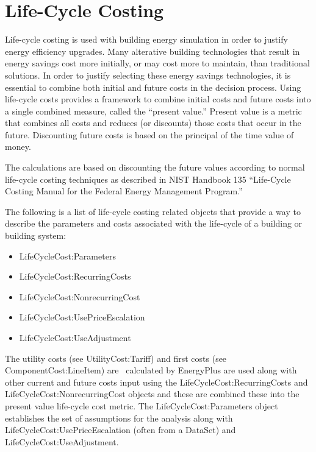 \section{Life-Cycle Costing}\label{life-cycle-costing}

Life-cycle costing is used with building energy simulation in order to justify energy efficiency upgrades. Many alterative building technologies that result in energy savings cost more initially, or may cost more to maintain, than traditional solutions. In order to justify selecting these energy savings technologies, it is essential to combine both initial and future costs in the decision process. Using life-cycle costs provides a framework to combine initial costs and future costs into a single combined measure, called the ``present value.'' Present value is a metric that combines all costs and reduces (or discounts) those costs that occur in the future. Discounting future costs is based on the principal of the time value of money.

The calculations are based on discounting the future values according to normal life-cycle costing techniques as described in NIST Handbook 135 ``Life-Cycle Costing Manual for the Federal Energy Management Program.''

The following is a list of life-cycle costing related objects that provide a way to describe the parameters and costs associated with the life-cycle of a building or building system:

\begin{itemize}
\item
  LifeCycleCost:Parameters
\item
  LifeCycleCost:RecurringCosts
\item
  LifeCycleCost:NonrecurringCost
\item
  LifeCycleCost:UsePriceEscalation
\item
  LifeCycleCost:UseAdjustment
\end{itemize}

The utility costs (see UtilityCost:Tariff) and first costs (see ComponentCost:LineItem) are~ calculated by EnergyPlus are used along with other current and future costs input using the LifeCycleCost:RecurringCosts and LifeCycleCost:NonrecurringCost objects and these are combined these into the present value life-cycle cost metric. The LifeCycleCost:Parameters object establishes the set of assumptions for the analysis along with LifeCycleCost:UsePriceEscalation (often from a DataSet) and LifeCycleCost:UseAdjustment.

